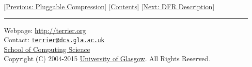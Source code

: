 {[}\href{compression.html}{Previous: Pluggable Compression}{]}
{[}\href{index.html}{Contents}{]} {[}\href{dfr_description.html}{Next:
DFR Description}{]}

\begin{center}\rule{0.5\linewidth}{\linethickness}\end{center}

Webpage: \url{http://terrier.org}\\
Contact:
\href{mailto:terrier@dcs.gla.ac.uk}{\nolinkurl{terrier@dcs.gla.ac.uk}}\\
\href{http://www.dcs.gla.ac.uk/}{School of Computing Science}\\
Copyright (C) 2004-2015 \href{http://www.gla.ac.uk/}{University of
Glasgow}. All Rights Reserved.

